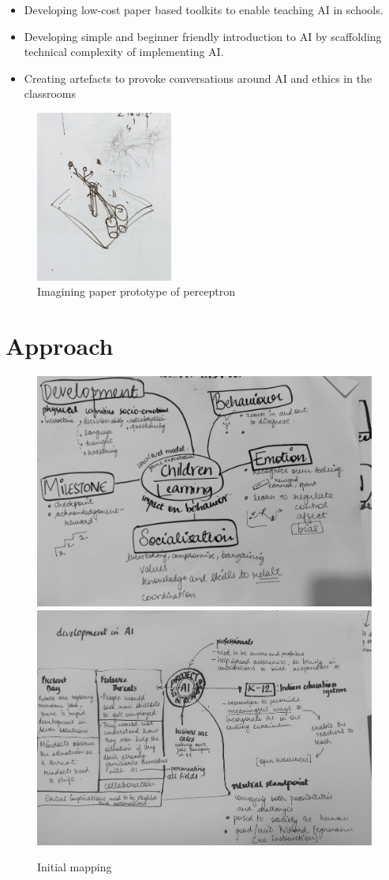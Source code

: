 \documentclass	[a4paper,11pt, hidelinks]{article}
\theoremstyle{definition}
\begin{document}
\begin{itemize}
  \item Developing low-cost paper based toolkits to enable teaching AI in schools. 
  \item Developing simple and beginner friendly introduction to AI by scaffolding technical complexity of implementing AI.
  \item Creating artefacts to provoke conversations around AI and ethics in the classrooms 
\end{itemize}

\begin{figure}[h]
  \center
  \includegraphics[width=0.4\textwidth]{papertool1.jpg}
  \caption{Imagining paper prototype of perceptron}
\end{figure}

\section{Approach}

\begin{figure}[h]
  \center
  \includegraphics[height=0.25\textwidth]{block1-1.jpg}
  \includegraphics[height=0.25\textwidth]{block1-2.jpg}
  \caption{Initial mapping}
\end{figure}
\end{document}
